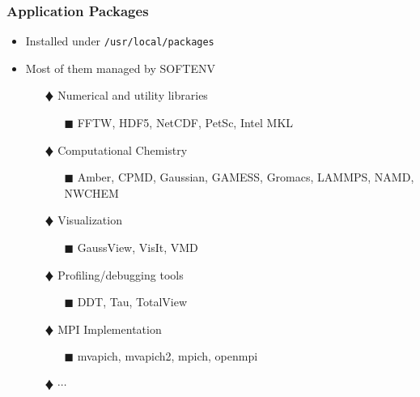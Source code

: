\documentclass[slidestop,mathserif,compress,xcolor=svgnames,table]{beamer}
\begin{document}
\begin{frame}
  \frametitle{\small Application Packages}
  \begin{itemize}
    \item Installed under \texttt{/usr/local/packages}
    \item Most of them managed by SOFTENV
    \begin{itemize}
      \item[$\vardiamond$] Numerical and utility libraries
      \begin{enumerate}
	\item[$\blacksquare$] FFTW, HDF5, NetCDF, PetSc, Intel MKL
      \end{enumerate}
      \item[$\vardiamond$] Computational Chemistry
      \begin{enumerate}
	\item[$\blacksquare$] Amber, CPMD, Gaussian, GAMESS, Gromacs, LAMMPS, NAMD, NWCHEM
      \end{enumerate}
      \item[$\vardiamond$] Visualization
      \begin{enumerate}
	\item[$\blacksquare$] GaussView, VisIt, VMD 
      \end{enumerate}
      \item[$\vardiamond$] Profiling/debugging tools
      \begin{enumerate}
	\item[$\blacksquare$] DDT, Tau, TotalView
      \end{enumerate}
      \item[$\vardiamond$] MPI Implementation
      \begin{enumerate}
	\item[$\blacksquare$] mvapich, mvapich2, mpich, openmpi
      \end{enumerate}
      \item[$\vardiamond$] $\cdots$
    \end{itemize}
  \end{itemize}
\end{frame}
\end{document}
